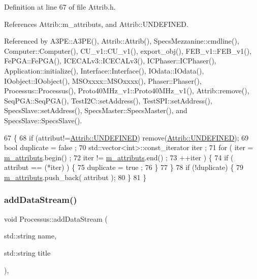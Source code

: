 Definition at line 67 of file Attrib.\+h.



References Attrib\+::m\+\_\+attributs, and Attrib\+::\+U\+N\+D\+E\+F\+I\+N\+ED.



Referenced by A3\+P\+E\+::\+A3\+P\+E(), Attrib\+::\+Attrib(), Specs\+Mezzanine\+::cmdline(), Computer\+::\+Computer(), C\+U\+\_\+v1\+::\+C\+U\+\_\+v1(), export\+\_\+obj(), F\+E\+B\+\_\+v1\+::\+F\+E\+B\+\_\+v1(), Fe\+P\+G\+A\+::\+Fe\+P\+G\+A(), I\+C\+E\+C\+A\+Lv3\+::\+I\+C\+E\+C\+A\+Lv3(), I\+C\+Phaser\+::\+I\+C\+Phaser(), Application\+::initialize(), Interface\+::\+Interface(), I\+Odata\+::\+I\+Odata(), I\+Oobject\+::\+I\+Oobject(), M\+S\+Oxxxx\+::\+M\+S\+Oxxxx(), Phaser\+::\+Phaser(), Processus\+::\+Processus(), Proto40\+M\+Hz\+\_\+v1\+::\+Proto40\+M\+Hz\+\_\+v1(), Attrib\+::remove(), Seq\+P\+G\+A\+::\+Seq\+P\+G\+A(), Test\+I2\+C\+::set\+Address(), Test\+S\+P\+I\+::set\+Address(), Specs\+Slave\+::set\+Address(), Specs\+Master\+::\+Specs\+Master(), and Specs\+Slave\+::\+Specs\+Slave().


\begin{DoxyCode}
67                             \{
68     \textcolor{keywordflow}{if} (attribut!=\hyperlink{classAttrib_a69e171d7cc6417835a5a306d3c764235a3a8da2ab97dda18aebab196fe4100531}{Attrib::UNDEFINED}) \textcolor{keyword}{remove}(\hyperlink{classAttrib_a69e171d7cc6417835a5a306d3c764235a3a8da2ab97dda18aebab196fe4100531}{Attrib::UNDEFINED});
69     \textcolor{keywordtype}{bool} duplicate = false ;
70     std::vector<int>::const\_iterator iter ;
71     \textcolor{keywordflow}{for} ( iter  = \hyperlink{classAttrib_ac4bd58a0cc6b38a3b711d609a3d3aacc}{m\_attributs}.begin() ;
72           iter != \hyperlink{classAttrib_ac4bd58a0cc6b38a3b711d609a3d3aacc}{m\_attributs}.end()   ;
73           ++iter ) \{
74       \textcolor{keywordflow}{if} ( attribut == (*iter) ) \{
75         duplicate = true ;
76       \}
77     \}
78     \textcolor{keywordflow}{if} (!duplicate) \{
79       \hyperlink{classAttrib_ac4bd58a0cc6b38a3b711d609a3d3aacc}{m\_attributs}.push\_back( attribut );
80     \}
81   \}
\end{DoxyCode}
\mbox{\label{classProcessus_a308c8f193802f1d1ab49d4447d0cb281}} 
\subsubsection{\texorpdfstring{add\+Data\+Stream()}{addDataStream()}}
{\footnotesize\ttfamily void Processus\+::add\+Data\+Stream (\begin{DoxyParamCaption}\item[{std\+::string}]{name,  }\item[{std\+::string}]{title }\end{DoxyParamCaption})\hspace{0.3cm}{\ttfamily [inline]}, {\ttfamily [inherited]}}



